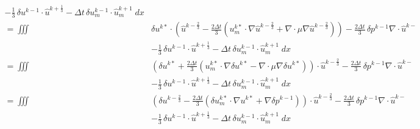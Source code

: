 \[\begin{split}
  - \frac13\, \delta u^{k-1} \cdot \hat u^{k+\frac13}
  - \Delta t\, \delta u_m^{k-1} \cdot \hat u_m^{k+1}\; dx \\
 =  \iiint & \delta u^{k*} \cdot \left( \hat u^{k-\frac23} - \frac{2\Delta t}3 
    \left(u_m^{k*} \cdot \nabla \hat u^{k-\frac23}
    + \nabla \cdot \mu \nabla \hat u^{k-\frac23}\right) \right)
  - \frac{2 \Delta t}{3}\, \delta p^{k-1} \nabla \cdot \hat u^{k-} \\
 &- \frac13\, \delta u^{k-1} \cdot \hat u^{k+\frac13}
  - \Delta t\, \delta u_m^{k-1} \cdot \hat u_m^{k+1}\; dx \\
 =  \iiint & \left( \delta u^{k*} + \frac{2\Delta t}3 
    \left(u_m^{k*} \cdot \nabla \delta u^{k*}
    - \nabla \cdot \mu \nabla \delta u^{k*}\right) \right) \cdot
    \hat u^{k-\frac23}
  - \frac{2 \Delta t}{3}\, \delta p^{k-1} \nabla \cdot \hat u^{k-} \\
 &- \frac13\, \delta u^{k-1} \cdot \hat u^{k+\frac13}
  - \Delta t\, \delta u_m^{k-1} \cdot \hat u_m^{k+1}\; dx \\
 =  \iiint & \left( \delta u^{k-\frac23} - \frac{2\Delta t}3 
    \left(\delta u_m^{k*} \cdot \nabla u^{k*}
    + \nabla \delta p^{k-1}\right) \right) \cdot \hat u^{k-\frac23}
  - \frac{2 \Delta t}{3}\, \delta p^{k-1} \nabla \cdot \hat u^{k-} \\
 &- \frac13\, \delta u^{k-1} \cdot \hat u^{k+\frac13}
  - \Delta t\, \delta u_m^{k-1} \cdot \hat u_m^{k+1}\; dx \\
\end{split} \]

